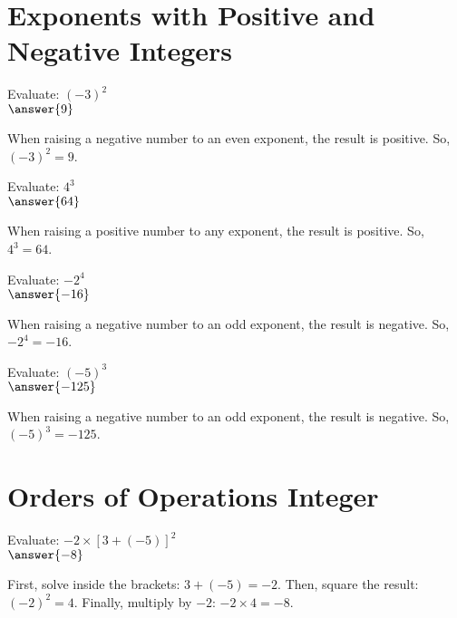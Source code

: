 \documentclass{ximera}
\begin{document}


\section*{Exponents with Positive and Negative Integers}

\begin{problem}
Evaluate: $(-3)^2$\\
$\answer{9}$
\begin{feedback}
When raising a negative number to an even exponent, the result is positive. So, $(-3)^2 = 9$.
\end{feedback}
\end{problem}

\begin{problem}
Evaluate: $4^3$\\
$\answer{64}$
\begin{feedback}
When raising a positive number to any exponent, the result is positive. So, $4^3 = 64$.
\end{feedback}
\end{problem}

\begin{problem}
Evaluate: $-2^4$\\
$\answer{-16}$
\begin{feedback}
When raising a negative number to an odd exponent, the result is negative. So, $-2^4 = -16$.
\end{feedback}
\end{problem}

\begin{problem}
Evaluate: $(-5)^3$\\
$\answer{-125}$
\begin{feedback}
When raising a negative number to an odd exponent, the result is negative. So, $(-5)^3 = -125$.
\end{feedback}
\end{problem}



\section*{Orders of Operations Integer}

\begin{problem}
Evaluate: $-2 \times [3 + (-5)]^2$\\
$\answer{-8}$
\begin{feedback}
First, solve inside the brackets: $3 + (-5) = -2$. Then, square the result: $(-2)^2 = 4$. Finally, multiply by $-2$: $-2 \times 4 = -8$.
\end{feedback}
\end{problem}
\end{document}
